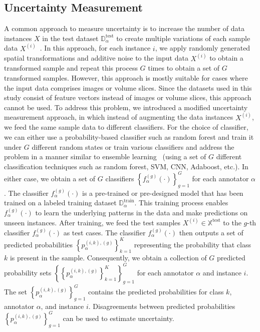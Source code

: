 \subsection{Uncertainty Measurement}\label{subsec:crowd.uncertainty}
A common approach to measure uncertainty is to increase the number of data instances $X $ in the test dataset $\mathbb{D}_\alpha^{\mathrm{test}} $ to create multiple variations of each sample data $X^{(i)} $~\cite{ayhan_TestTime_2018}. In this approach, for each instance $i $, we apply randomly generated spatial transformations and additive noise to the input data $X^{(i)} $ to obtain a transformed sample and repeat this process $G $ times to obtain a set of $G $ transformed samples.
However, this approach is mostly suitable for cases where the input data comprises images or volume slices. Since the datasets used in this study consist of feature vectors instead of images or volume slices, this approach cannot be used. To address this problem, we introduced a modified uncertainty measurement approach, in which instead of augmenting the data instances $X^{(i)} $, we feed the same sample data to different classifiers.
For the choice of classifier, we can either use a probability-based classifier such as random forest and train it under $G $ different random states or train various classifiers and address the problem in a manner similar to ensemble learning~\cite{zhou_Ensemblelearning_2009} (using a set of $G $ different classification techniques such as random forest, SVM, CNN, Adaboost, etc.). In either case, we obtain a set of $G $ classifiers ${\left\{f_{\alpha}^{(g)}( \cdot)\right\}}_{g=1}^G $ for each annotator $\alpha $. The classifier $f_{\alpha}^{(g)}( \cdot) $ is a pre-trained or pre-designed model that has been trained on a labeled training dataset $\mathbb{D}_\alpha^{\mathrm{train}} $. This training process enables $f_{\alpha}^{(g)}(\cdot) $ to learn the underlying patterns in the data and make predictions on unseen instances.
After training, we feed the test samples $X^{(i)}\in \mathbb{X}^{\text{test}} $ to the $g $-th classifier $f_{\alpha}^{(g)}(\cdot) $ as test cases. The classifier $f_{\alpha}^{(g)}(\cdot) $ then outputs a set of predicted probabilities $\left\{p_{\alpha}^{(i,k),(g)}\right\}_{k=1}^{K} $ representing the probability that class $k $ is present in the sample. Consequently, we obtain a collection of $G $ predicted probability sets $\left\{ \left\{ p_{\alpha}^{(i,k),(g)}\right\}_{k=1}^K \right\}_{g=1}^G $ for each annotator $\alpha $ and instance $i $. The set $\left\{p_{\alpha}^{(i,k),(g)}\right\}_{g=1}^G $ contains the predicted probabilities for class $k $, annotator $\alpha $, and instance $i $. Disagreements between predicted probabilities $\left\{p_{\alpha}^{(i,k),(g)}\right\}_{g=1}^G $ can be used to estimate uncertainty.
